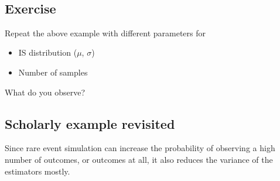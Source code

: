 \documentclass[11pt,a4paper, d]{scrartcl}
\providecommand{\tightlist}{%
      \setlength{\itemsep}{0pt}\setlength{\parskip}{0pt}}
\begin{document}
    \begin{center}
    \end{center}
    { \hspace*{\fill} \\}
    
    \hypertarget{exercise}{%
\subsection{Exercise}\label{exercise}}

Repeat the above example with different parameters for

\begin{itemize}
\tightlist
\item
  IS distribution (\(\mu\), \(\sigma\))
\item
  Number of samples
\end{itemize}

What do you observe?

    \hypertarget{scholarly-example-revisited}{%
\subsection{Scholarly example
revisited}\label{scholarly-example-revisited}}

Since rare event simulation can increase the probability of observing a
high number of outcomes, or outcomes at all, it also reduces the
variance of the estimators mostly.
\end{document}
